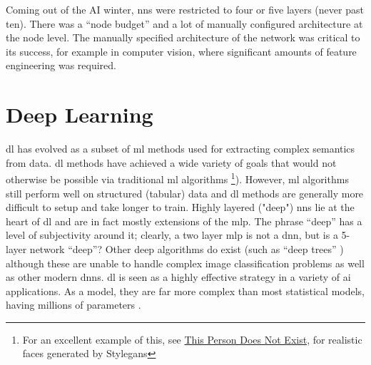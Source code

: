 \bigskip
Coming out of the AI winter, \gls{nn}s were restricted to four or five layers (never past ten). There was a \enquote{node budget} and a lot of manually configured architecture at the node level. The manually specified architecture of the network was critical to its success, for example in computer vision, where significant amounts of feature engineering was required. 
\bigskip


\section{Deep Learning}

\gls{dl} has evolved as a subset of \gls{ml} methods used for extracting complex semantics from data. \gls{dl} methods have achieved a wide variety of goals that would not otherwise be possible via traditional \gls{ml} algorithms \footnote{For an excellent example of this, see \href{https://www.thispersondoesnotexist.com/}{This Person Does Not Exist}, for realistic faces generated by Style\gls{gan}s}). However, \gls{ml} algorithms still perform well on structured (tabular) data and \gls{dl} methods are generally more difficult to setup and take longer to train. 
Highly layered ("deep") \gls{nn}s lie at the heart of \gls{dl} and are in fact mostly extensions of the \gls{mlp}. The phrase \enquote{deep} has a level of subjectivity around it; clearly, a two \gls{layer} \gls{mlp} is not a \gls{dnn}, but is a 5-layer network \enquote{deep}? Other deep algorithms do exist (such as \enquote{deep trees} \cite{deep_forest}) although these are unable to handle complex image classification problems as well as other modern \gls{dnn}s. \gls{dl} is seen as a highly effective strategy in a variety of \gls{ai} applications. As a model, they are far more complex than most statistical models, having millions of parameters \cite{unreasonable_dl}.  
\bigskip

